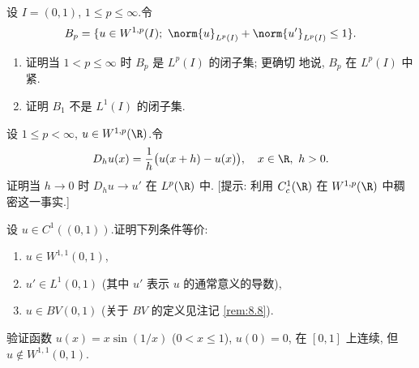 \begin{exercise}
\label{exer:8.12}
设 $I=(0,1)$, $1\le p\le\infty$.令
\begin{equation*}
B_p=\{u\in W^{1,p}(I);\ \norm{u}_{L^p(I)}+\norm{u'}_{L^p(I)}\le1\}.
\end{equation*}
\begin{enumerate}[label=\arabic*., leftmargin=2.2em, itemsep=0.3em]
	\item 证明当 $1<p\le\infty$ 时 $B_p$ 是 $L^p(I)$ 的闭子集; 更确切
	      地说, $B_p$ 在 $L^p(I)$ 中紧.
	\item 证明 $B_1$ 不是 $L^1(I)$ 的闭子集.
\end{enumerate}
\end{exercise}

\begin{exercise}
\label{exer:8.13}
设 $1\le p<\infty$, $u\in W^{1,p}(\R)$.令
\begin{equation*}
D_hu(x)=\frac1h\bigl(u(x+h)-u(x)\bigr),\quad x\in\R,\ h>0.
\end{equation*}
证明当 $h\to0$ 时 $D_hu\to u'$ 在 $L^p(\R)$ 中.
[提示: 利用 $C_c^1(\R)$ 在 $W^{1,p}(\R)$ 中稠密这一事实.]
\end{exercise}

\begin{exercise}
\label{exer:8.14}
设 $u\in C^1((0,1))$.证明下列条件等价:
\begin{enumerate}[label=(\alph*), leftmargin=2.4em, itemsep=0.2em]
	\item $u\in W^{1,1}(0,1)$,
	\item $u'\in L^1(0,1)$ (其中 $u'$ 表示 $u$ 的通常意义的导数),
	\item $u\in BV(0,1)$ (关于 $BV$ 的定义见注记 \ref{rem:8.8}).
\end{enumerate}
验证函数 $u(x)=x\sin(1/x)$ ($0<x\le1$), $u(0)=0$, 在 $[0,1]$ 上连续,
但 $u\notin W^{1,1}(0,1)$.
\end{exercise}

